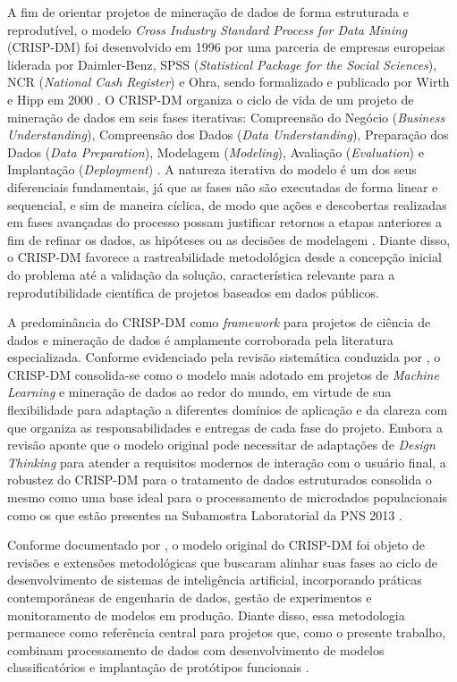 A fim de orientar projetos de mineração de dados de forma estruturada e reprodutível, o modelo \textit{Cross Industry Standard Process for Data Mining} (CRISP-DM) foi desenvolvido em 1996 por uma parceria de empresas europeias liderada por Daimler-Benz, SPSS (\textit{Statistical Package for the Social Sciences}), NCR (\textit{National Cash Register}) e Ohra, sendo formalizado e publicado por Wirth e Hipp em 2000 \cite{wirth2000crisp}. O CRISP-DM organiza o ciclo de vida de um projeto de mineração de dados em seis fases iterativas: Compreensão do Negócio (\textit{Business Understanding}), Compreensão dos Dados (\textit{Data Understanding}), Preparação dos Dados (\textit{Data Preparation}), Modelagem (\textit{Modeling}), Avaliação (\textit{Evaluation}) e Implantação (\textit{Deployment}) \cite{wirth2000crisp}. A natureza iterativa do modelo é um dos seus diferenciais fundamentais, já que as fases não são executadas de forma linear e sequencial, e sim de maneira cíclica, de modo que ações e descobertas realizadas em fases avançadas do processo possam justificar retornos a etapas anteriores a fim de refinar os dados, as hipóteses ou as decisões de modelagem \cite{wirth2000crisp}. Diante disso, o CRISP-DM favorece a rastreabilidade metodológica desde a concepção inicial do problema até a validação da solução, característica relevante para a reprodutibilidade científica de projetos baseados em dados públicos.

A predominância do CRISP-DM como \textit{framework} para projetos de ciência de dados e mineração de dados é amplamente corroborada pela literatura especializada. Conforme evidenciado pela revisão sistemática conduzida por \textcite{schroer2021systematic}, o CRISP-DM consolida-se como o modelo mais adotado em projetos de \textit{Machine Learning} e mineração de dados ao redor do mundo, em virtude de sua flexibilidade para adaptação a diferentes domínios de aplicação e da clareza com que organiza as responsabilidades e entregas de cada fase do projeto. Embora a revisão aponte que o modelo original pode necessitar de adaptações de \textit{Design Thinking} para atender a requisitos modernos de interação com o usuário final, a robustez do CRISP-DM para o tratamento de dados estruturados consolida o mesmo como uma base ideal para o processamento de microdados populacionais como os que estão presentes na Subamostra Laboratorial da PNS 2013 \cite{schroer2021systematic}.

Conforme documentado por \textcite{shimaoka2024evolution}, o modelo original do CRISP-DM foi objeto de revisões e extensões metodológicas que buscaram alinhar suas fases ao ciclo de desenvolvimento de sistemas de inteligência artificial, incorporando práticas contemporâneas de engenharia de dados, gestão de experimentos e monitoramento de modelos em produção. Diante disso, essa metodologia permanece como referência central para projetos que, como o presente trabalho, combinam processamento de dados com desenvolvimento de modelos classificatórios e implantação de protótipos funcionais \cite{shimaoka2024evolution}.

